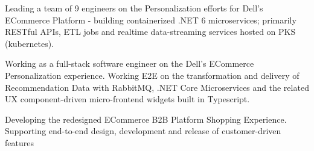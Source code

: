 \documentclass[10pt,a4paper,ragged2e,withhyper]{altacv}
\begin{document}
\begin{paracol}{2}


Leading a team of 9 engineers on the Personalization efforts for Dell's ECommerce Platform -
building containerized .NET 6 \newline microservices; primarily
RESTful APIs, ETL jobs and realtime data-streaming services hosted on PKS (kubernetes).
\smallskip \newline



\divider


Working as a full-stack software engineer on the Dell's  \newline
 ECommerce Personalization experience. Working E2E on the  \newline 
transformation and delivery of Recommendation Data with  \newline 
RabbitMQ, .NET Core Microservices and the related UX
component-driven micro-frontend widgets built in Typescript.
\smallskip \newline



\divider


Developing the redesigned ECommerce B2B Platform Shopping  \newline 
Experience. Supporting end-to-end design, development and  \newline 
release of customer-driven features
\smallskip \newline


\end{paracol}
\end{document}

